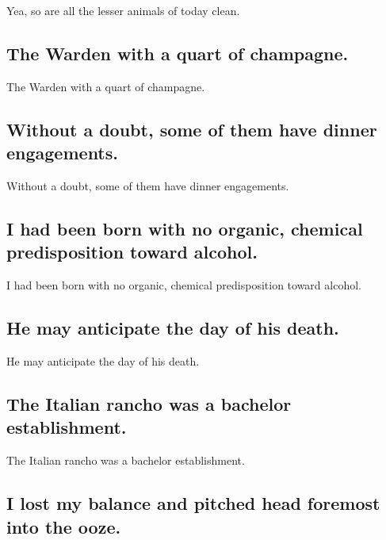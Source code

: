 \documentclass[]{article}
\begin{document}
Yea, so are all the lesser animals of today clean.

\hypertarget{the-warden-with-a-quart-of-champagne.}{%
\subsection{The Warden with a quart of
champagne.}\label{the-warden-with-a-quart-of-champagne.}}

The Warden with a quart of champagne.

\hypertarget{without-a-doubt-some-of-them-have-dinner-engagements.}{%
\subsection{Without a doubt, some of them have dinner
engagements.}\label{without-a-doubt-some-of-them-have-dinner-engagements.}}

Without a doubt, some of them have dinner engagements.

\hypertarget{i-had-been-born-with-no-organic-chemical-predisposition-toward-alcohol.}{%
\subsection{I had been born with no organic, chemical predisposition
toward
alcohol.}\label{i-had-been-born-with-no-organic-chemical-predisposition-toward-alcohol.}}

I had been born with no organic, chemical predisposition toward alcohol.

\hypertarget{he-may-anticipate-the-day-of-his-death.}{%
\subsection{He may anticipate the day of his
death.}\label{he-may-anticipate-the-day-of-his-death.}}

He may anticipate the day of his death.

\hypertarget{the-italian-rancho-was-a-bachelor-establishment.}{%
\subsection{The Italian rancho was a bachelor
establishment.}\label{the-italian-rancho-was-a-bachelor-establishment.}}

The Italian rancho was a bachelor establishment.

\hypertarget{i-lost-my-balance-and-pitched-head-foremost-into-the-ooze.}{%
\subsection{I lost my balance and pitched head foremost into the
ooze.}\label{i-lost-my-balance-and-pitched-head-foremost-into-the-ooze.}}
\end{document}
